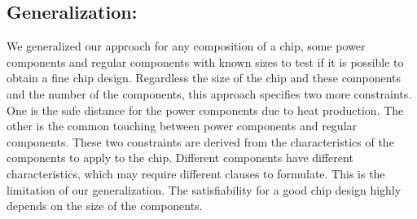 \subsection*{Generalization:}
We generalized our approach for any composition of a chip, some power components and regular components with known sizes to test if it is possible to obtain a fine chip design. Regardless the size of the chip and these components and the number of the components, this approach specifies two more constraints. One is the safe distance for the power components due to heat production. The other is the common touching between power components and regular components. These two constraints are derived from the characteristics of the components to apply to the chip. Different components have different characteristics, which may require different clauses to formulate. This is the limitation of our generalization. The satisfiability for a good chip design highly depends on the size of the components.




